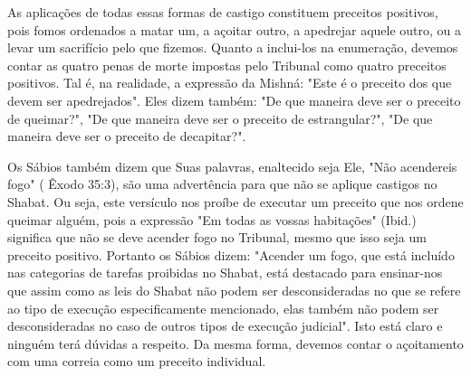 \begin{itemize}
\begin{enumrate}
\begin{itemize}
As aplicações de todas essas formas de castigo constituem preceitos
positivos, pois fomos ordenados a matar um, a açoitar outro, a apedrejar
aque­le outro, ou a levar um sacrifício pelo que fizemos. Quanto a
inclui-los na enu­meração, devemos contar as quatro penas de morte
impostas pelo Tribunal co­mo quatro preceitos positivos. Tal é, na
realidade, a expressão da Mishná: "Es­te é o preceito dos que devem ser
apedrejados". Eles dizem também: "De que maneira deve ser o preceito de
queimar?", "De que maneira deve ser o precei­to de estrangular?", "De
que maneira deve ser o preceito de decapitar?".

Os Sábios também dizem que Suas palavras, enaltecido seja Ele, "Não
acendereis fogo" ( Êxodo 35:3), são uma advertência para que não se
aplique castigos no Shabat. Ou seja, este versículo nos proíbe de
executar um preceito que nos ordene queimar alguém, pois a expressão "Em
todas as vossas habita­ções" (Ibid.) significa que não se deve acender
fogo no Tribunal, mesmo que isso seja um preceito positivo. Portanto os
Sábios dizem: "Acender um fogo, que está incluído nas categorias de
tarefas proibidas no Shabat, está destacado para ensinar-nos que assim
como as leis do Shabat não podem ser desconside­radas no que se refere
ao tipo de execução especificamente mencionado, elas também não podem
ser desconsideradas no caso de outros tipos de execução judicial". Isto
está claro e ninguém terá dúvidas a respeito. Da mesma forma, devemos
contar o açoitamento com uma correia como um preceito individual.


\end{itemize}
\end{enumrate}
\end{itemize}
